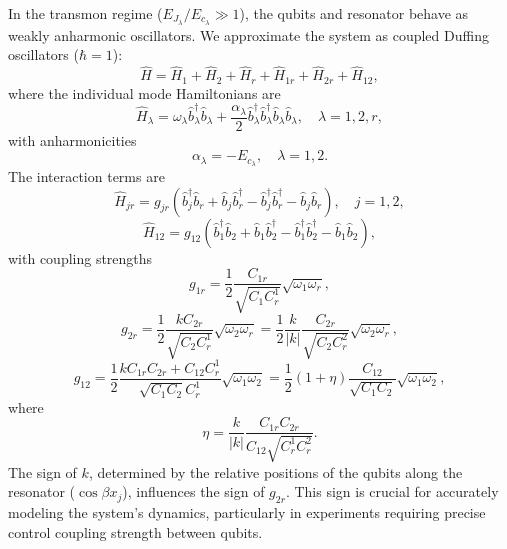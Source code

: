 \documentclass[reprint,superscriptaddress,preprintnumbers,longbibliography,
amsmath,amssymb,aps,floatfix,pra,twocolumn, tightenlines %
]{revtex4-2}
\begin{document}
In the transmon regime (\( E_{J_\lambda} / E_{c_\lambda} \gg 1 \)), the qubits and resonator behave as weakly anharmonic oscillators. We approximate the system as coupled Duffing oscillators (\( \hbar = 1 \)):
\begin{equation}
\hat{H} = \hat{H}_1 + \hat{H}_2 + \hat{H}_r + \hat{H}_{1r} + \hat{H}_{2r} + \hat{H}_{12}, 
\end{equation}
where the individual mode Hamiltonians are
\begin{equation}
 \hat{H}_\lambda = \omega_\lambda \hat{b}_\lambda^\dagger \hat{b}_\lambda + \frac{\alpha_\lambda}{2} \hat{b}_\lambda^\dagger \hat{b}_\lambda^\dagger \hat{b}_\lambda \hat{b}_\lambda, \quad \lambda = 1, 2, r, 
 \end{equation}
with anharmonicities
\begin{equation}
 \alpha_\lambda = -E_{c_\lambda}, \quad \lambda = 1, 2. 
\end{equation}
The interaction terms are
\begin{equation}
 \hat{H}_{jr} = g_{jr} \left( \hat{b}_j^\dagger \hat{b}_r + \hat{b}_j \hat{b}_r^\dagger - \hat{b}_j^\dagger \hat{b}_r^\dagger - \hat{b}_j \hat{b}_r \right), \quad j = 1, 2, 
\end{equation}
\begin{equation}
 \hat{H}_{12} = g_{12} \left( \hat{b}_1^\dagger \hat{b}_2 + \hat{b}_1 \hat{b}_2^\dagger - \hat{b}_1^\dagger \hat{b}_2^\dagger - \hat{b}_1 \hat{b}_2 \right), 
\end{equation}
with coupling strengths
\begin{equation}
 g_{1r} = \frac{1}{2} \frac{C_{1r}}{\sqrt{C_1 C_r^1}} \sqrt{\omega_1 \omega_r}, 
\end{equation}
\begin{equation}
 g_{2r} = \frac{1}{2} \frac{k C_{2r}}{\sqrt{C_2 C_r^1}} \sqrt{\omega_2 \omega_r} = \frac{1}{2} \frac{k}{|k|} \frac{C_{2r}}{\sqrt{C_2 C_r^2}} \sqrt{\omega_2 \omega_r},
\end{equation}
\begin{equation}
 g_{12} = \frac{1}{2} \frac{k C_{1r} C_{2r} + C_{12} C_r^1}{\sqrt{C_1 C_2} C_r^1} \sqrt{\omega_1 \omega_2} = \frac{1}{2} (1 + \eta) \frac{C_{12}}{\sqrt{C_1 C_2}} \sqrt{\omega_1 \omega_2},
\end{equation}
where
\begin{equation}
\eta = \frac{k}{|k|} \frac{C_{1r} C_{2r}}{C_{12} \sqrt{C_r^1 C_r^2}}. 
\end{equation}
The sign of \( k \), determined by the relative positions of the qubits along the resonator (\( \cos \beta x_j \)), influences the sign of \( g_{2r} \). This sign is crucial for accurately modeling the system’s dynamics, particularly in experiments requiring precise control coupling strength between qubits. 
\end{document}
